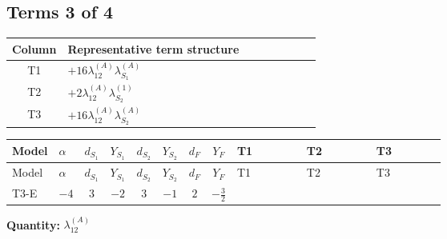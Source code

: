 \documentclass[8pt]{article}
\begin{document}
\begin{landscape}
\subsection*{Terms 3 of 4}
\begin{center}
\begin{tabular}{@{}c >{\raggedright\arraybackslash}p{0.82\linewidth}@{}}
\toprule
Column & Representative term structure \\
\midrule
T1 & \(\displaystyle +16 {\lambda_{12}^{(A)}} {\lambda_{S_1}^{(A)}}\) \\
\midrule
T2 & \(\displaystyle +2 {\lambda_{12}^{(A)}} {\lambda_{S_2}^{(1)}}\) \\
\midrule
T3 & \(\displaystyle +16 {\lambda_{12}^{(A)}} {\lambda_{S_2}^{(A)}}\) \\
\midrule
\bottomrule
\end{tabular}
\end{center}
\smallskip
\tiny
\begin{longtable}{@{}llcccccc >{\raggedright\arraybackslash}p{0.21\linewidth} >{\raggedright\arraybackslash}p{0.21\linewidth} >{\raggedright\arraybackslash}p{0.21\linewidth}@{}}
\toprule
Model & $\alpha$ & $d_{S_1}$ & $Y_{S_1}$ & $d_{S_2}$ & $Y_{S_2}$ & $d_F$ & $Y_F$ & T1 & T2 & T3 \\
\midrule
\endfirsthead
\toprule
Model & $\alpha$ & $d_{S_1}$ & $Y_{S_1}$ & $d_{S_2}$ & $Y_{S_2}$ & $d_F$ & $Y_F$ & T1 & T2 & T3 \\
\midrule
\endhead
T3-E & $-4$ & $3$ & $-2$ & $3$ & $-1$ & $2$ & $-\frac{3}{2}$ & \scriptsize\adjustbox{max width=\linewidth}{$\begin{gathered} +16 {\lambda_{12}^{(A)}} {\lambda_{S_1}^{(A)}}\end{gathered}$} & \scriptsize\adjustbox{max width=\linewidth}{$\begin{gathered} +2 {\lambda_{12}^{(A)}} {\lambda_{S_2}^{(1)}}\end{gathered}$} & \scriptsize\adjustbox{max width=\linewidth}{$\begin{gathered} +16 {\lambda_{12}^{(A)}} {\lambda_{S_2}^{(A)}}\end{gathered}$} \\
\midrule
\bottomrule
\end{longtable}
\clearpage
\noindent\textbf{Quantity: }$\lambda_{12}^{(A)}$\par\smallskip

\end{landscape}
\end{document}
